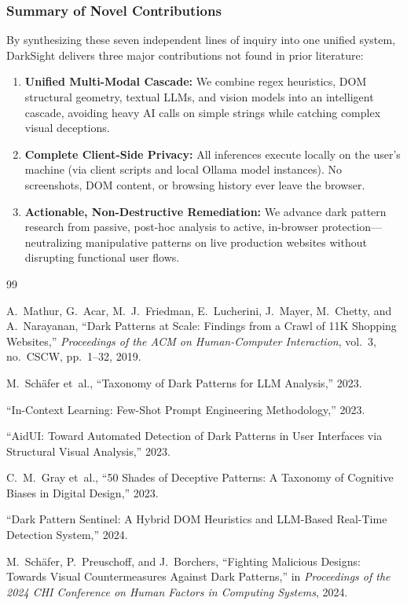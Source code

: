 \documentclass[11pt,a4paper]{article}
\begin{document}
\subsubsection{Summary of Novel Contributions}
By synthesizing these seven independent lines of inquiry into one unified system, DarkSight delivers three major contributions not found in prior literature:
\begin{enumerate}
    \item \textbf{Unified Multi-Modal Cascade:} We combine regex heuristics, DOM structural geometry, textual LLMs, and vision models into an intelligent cascade, avoiding heavy AI calls on simple strings while catching complex visual deceptions.
    \item \textbf{Complete Client-Side Privacy:} All inferences execute locally on the user's machine (via client scripts and local Ollama model instances). No screenshots, DOM content, or browsing history ever leave the browser.
    \item \textbf{Actionable, Non-Destructive Remediation:} We advance dark pattern research from passive, post-hoc analysis to active, in-browser protection—neutralizing manipulative patterns on live production websites without disrupting functional user flows.
\end{enumerate}

\begin{thebibliography}{99}

A.~Mathur, G.~Acar, M.~J.~Friedman, E.~Lucherini, J.~Mayer, M.~Chetty, and A.~Narayanan,
``Dark Patterns at Scale: Findings from a Crawl of 11K Shopping Websites,''
\textit{Proceedings of the ACM on Human-Computer Interaction}, vol.~3, no.~CSCW, pp.~1--32, 2019.

M.~Schäfer et~al.,
``Taxonomy of Dark Patterns for LLM Analysis,''
2023.

``In-Context Learning: Few-Shot Prompt Engineering Methodology,''
2023.

``AidUI: Toward Automated Detection of Dark Patterns in User Interfaces via Structural Visual Analysis,''
2023.

C.~M.~Gray et~al.,
``50 Shades of Deceptive Patterns: A Taxonomy of Cognitive Biases in Digital Design,''
2023.

``Dark Pattern Sentinel: A Hybrid DOM Heuristics and LLM-Based Real-Time Detection System,''
2024.

M.~Schäfer, P.~Preuschoff, and J.~Borchers,
``Fighting Malicious Designs: Towards Visual Countermeasures Against Dark Patterns,''
in \textit{Proceedings of the 2024 CHI Conference on Human Factors in Computing Systems}, 2024.

\end{thebibliography}
\end{document}
